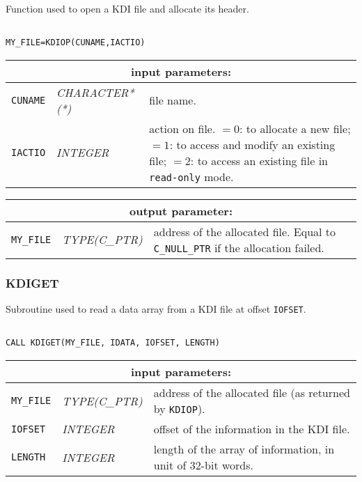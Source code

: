 Function used to open a KDI file and allocate its header.

\begin{verbatim}

MY_FILE=KDIOP(CUNAME,IACTIO)
\end{verbatim}

\noindent
\begin{tabular}{|p{1.5cm}|p{3cm}|p{10cm}|}
\hline
\multicolumn{3}{|c|}{\bf input parameters:} \\
\hline
{\tt CUNAME} & {\it CHARACTER*(*)}  &  file name.  \\
\hline
{\tt IACTIO} & {\it INTEGER}  & action on file.
$=0$: to allocate a new file;
$=1$: to access and modify an existing file;
$=2$: to access an existing file in {\tt read-only} mode.  \\
\hline
\end{tabular}

\vskip 0.4cm
\noindent
\begin{tabular}{|p{1.5cm}|p{3cm}|p{10cm}|}
\hline
\multicolumn{3}{|c|}{\bf output parameter:} \\
\hline
{\tt MY\_FILE} & {\it TYPE(C\_PTR)}  & address of the allocated file. Equal to {\tt C\_NULL\_PTR} if the allocation failed.  \\
\hline
\end{tabular}

\subsubsection{KDIGET}

Subroutine used to read a data array from a KDI file at offset {\tt IOFSET}.

\begin{verbatim}

CALL KDIGET(MY_FILE, IDATA, IOFSET, LENGTH)
\end{verbatim}

\noindent
\begin{tabular}{|p{1.5cm}|p{3cm}|p{10cm}|}
\hline
\multicolumn{3}{|c|}{\bf input parameters:} \\
\hline
{\tt MY\_FILE} & {\it TYPE(C\_PTR)} &  address of the allocated file (as returned by {\tt KDIOP}). \\
\hline
{\tt IOFSET} & {\it INTEGER}  & offset of the information in the KDI file. \\
\hline
{\tt LENGTH} & {\it INTEGER}  & length of the array of information, in unit of 32-bit words. \\
\hline
\end{tabular}

